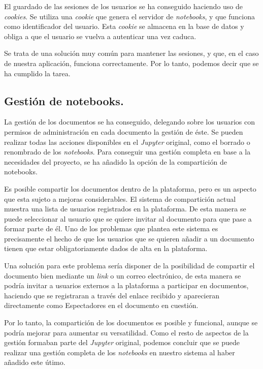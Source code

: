 \documentclass[11pt,spanish,listoffigures]{tfgetsinf}
\begin{document}
El guardado de las sesiones de los usuarios se ha conseguido haciendo uso de \textit{cookies}. Se utiliza una \textit{cookie} que genera el servidor de \textit{notebooks}, y que funciona como identificador del usuario. Esta \textit{cookie} se almacena en la base de datos y obliga a que el usuario se vuelva a autenticar una vez caduca.

Se trata de una solución muy común para mantener las sesiones, y que, en el caso de nuestra aplicación, funciona correctamente. Por lo tanto, podemos decir que se ha cumplido la tarea.


\subsection{Gestión de notebooks.}
\label{subsec:objetivos-conc-compartir}

La gestión de los documentos se ha conseguido, delegando sobre los usuarios con permisos de administración en cada documento la gestión de éste. Se pueden realizar todas las acciones disponibles en el \textit{Jupyter} original, como el borrado o renombrado de los \textit{notebooks}. Para conseguir una gestión completa en base a la necesidades del proyecto, se ha añadido la opción de la compartición de notebooks. 

Es posible compartir los documentos dentro de la plataforma, pero es un aspecto que esta sujeto a mejoras considerables. El sistema de compartición actual muestra una lista de usuarios registrados en la plataforma. De esta manera se puede seleccionar al usuario que se quiere invitar al documento para que pase a formar parte de él. Uno de los problemas que plantea este sistema es precisamente el hecho de que los usuarios que se quieren añadir a un documento tienen que estar obligatoriamente dados de alta en la plataforma.

Una solución para este problema sería disponer de la posibilidad de compartir el documento bien mediante un \textit{\gls{link}} o un correo electrónico, de esta manera se podría invitar a usuarios externos a la plataforma a participar en documentos, haciendo que se registraran a través del enlace recibido y aparecieran directamente como Espectadores en el documento en cuestión.

Por lo tanto, la compartición de los documentos es posible y funcional, aunque se podría mejorar para aumentar su versatilidad. Como el resto de aspectos de la gestión formaban parte del \textit{Jupyter} original, podemos concluir que se puede realizar una gestión completa de los \textit{notebooks} en nuestro sistema al haber añadido este útimo.
\end{document}
